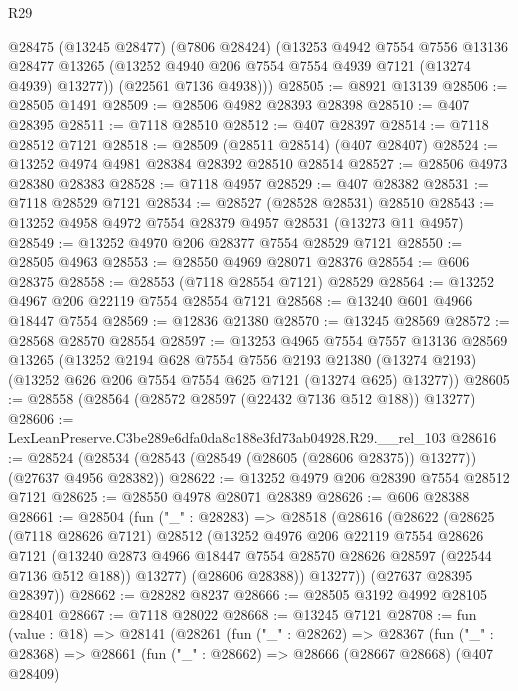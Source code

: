 \begin{lexlean}{R29}
\begin{coremodule}
      @28475
        (@13245 @28477)
        (@7806 @28424)
        (@13253
          @4942
          @7554
          @7556
          @13136
          @28477
          @13265
          (@13252 @4940 @206 @7554 @7554 @4939 @7121 (@13274 @4939) @13277))
        (@22561 @7136 @4938)))
@28505 := @8921 @13139
@28506 := @28505 @1491
@28509 := @28506 @4982 @28393 @28398
@28510 := @407 @28395
@28511 := @7118 @28510
@28512 := @407 @28397
@28514 := @7118 @28512 @7121
@28518 := @28509 (@28511 @28514) (@407 @28407)
@28524 := @13252 @4974 @4981 @28384 @28392 @28510 @28514
@28527 := @28506 @4973 @28380 @28383
@28528 := @7118 @4957
@28529 := @407 @28382
@28531 := @7118 @28529 @7121
@28534 := @28527 (@28528 @28531) @28510
@28543 := @13252 @4958 @4972 @7554 @28379 @4957 @28531 (@13273 @11 @4957)
@28549 := @13252 @4970 @206 @28377 @7554 @28529 @7121
@28550 := @28505 @4963
@28553 := @28550 @4969 @28071 @28376
@28554 := @606 @28375
@28558 := @28553 (@7118 @28554 @7121) @28529
@28564 := @13252 @4967 @206 @22119 @7554 @28554 @7121
@28568 := @13240 @601 @4966 @18447 @7554
@28569 := @12836 @21380
@28570 := @13245 @28569
@28572 := @28568 @28570 @28554
@28597 := @13253
    @4965
    @7554
    @7557
    @13136
    @28569
    @13265
    (@13252
      @2194
      @628
      @7554
      @7556
      @2193
      @21380
      (@13274 @2193)
      (@13252 @626 @206 @7554 @7554 @625 @7121 (@13274 @625) @13277))
@28605 := @28558 (@28564 (@28572 @28597 (@22432 @7136 @512 @188)) @13277)
@28606 := LexLeanPreserve.C3be289e6dfa0da8c188e3fd73ab04928.R29.__rel_103
@28616 := @28524 (@28534 (@28543 (@28549 (@28605 (@28606 @28375)) @13277)) (@27637 @4956 @28382))
@28622 := @13252 @4979 @206 @28390 @7554 @28512 @7121
@28625 := @28550 @4978 @28071 @28389
@28626 := @606 @28388
@28661 := @28504
    (fun ("_" : @28283) =>
    @28518
      (@28616
        (@28622
          (@28625
            (@7118 @28626 @7121)
            @28512
            (@13252
              @4976
              @206
              @22119
              @7554
              @28626
              @7121
              (@13240 @2873 @4966 @18447 @7554 @28570 @28626 @28597 (@22544 @7136 @512 @188))
              @13277)
            (@28606 @28388))
          @13277))
      (@27637 @28395 @28397))
@28662 := @28282 @8237
@28666 := @28505 @3192 @4992 @28105 @28401
@28667 := @7118 @28022
@28668 := @13245 @7121
@28708 := fun (value : @18) =>
  @28141
    (@28261
      (fun ("_" : @28262) =>
      @28367
        (fun ("_" : @28368) =>
        @28661
          (fun ("_" : @28662) =>
          @28666
            (@28667 @28668)
            (@407 @28409)

\end{coremodule}
\end{lexlean}
